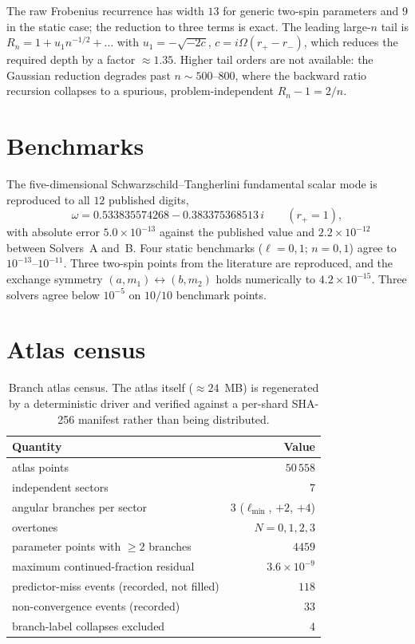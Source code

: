 \documentclass[aps,prd,onecolumn,superscriptaddress,nofootinbib]{revtex4-2}
\begin{document}
The raw Frobenius recurrence has width $13$ for generic two-spin parameters and
$9$ in the static case; the reduction to three terms is exact. The leading
large-$n$ tail is $R_n = 1 + u_1 n^{-1/2}+\dots$ with $u_1=-\sqrt{-2c}$,
$c=i\Omega(r_+-r_-)$, which reduces the required depth by a factor
$\approx1.35$. Higher tail orders are not available: the Gaussian reduction
degrades past $n\sim500$--$800$, where the backward ratio recursion collapses to
a spurious, problem-independent $R_n-1=2/n$.

\section{Benchmarks}\label{sec:bench}

The five-dimensional Schwarzschild--Tangherlini fundamental scalar mode is
reproduced to all $12$ published digits,
\begin{equation}
  \omega = 0.533835574268 - 0.383375368513\,i \qquad (r_+=1),
\end{equation}
with absolute error $5.0\times10^{-13}$ against the published value and
$2.2\times10^{-12}$ between Solvers~A and~B. Four static benchmarks
($\ell=0,1$; $n=0,1$) agree to $10^{-13}$--$10^{-11}$. Three two-spin points
from the literature are reproduced, and the exchange symmetry
$(a,m_1)\leftrightarrow(b,m_2)$ holds numerically to $4.2\times10^{-15}$.
Three solvers agree below $10^{-5}$ on $10/10$ benchmark points.

\section{Atlas census}\label{sec:atlas}

\begin{table}[H]
\centering
\begin{tabular}{lr}
\toprule
Quantity & Value \\
\midrule
atlas points & $50\,558$ \\
independent sectors & $7$ \\
angular branches per sector & $3$ \quad ($\ell_{\min}$, $+2$, $+4$) \\
overtones & $N=0,1,2,3$ \\
parameter points with $\ge2$ branches & $4459$ \\
maximum continued-fraction residual & $3.6\times10^{-9}$ \\
predictor-miss events (recorded, not filled) & $118$ \\
non-convergence events (recorded) & $33$ \\
branch-label collapses excluded & $4$ \\
\bottomrule
\end{tabular}
\caption{Branch atlas census. The atlas itself ($\approx24$~MB) is regenerated
by a deterministic driver and verified against a per-shard SHA-256 manifest
rather than being distributed.}
\end{table}
\end{document}
